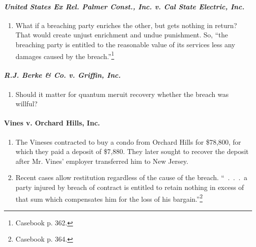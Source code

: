 \paragraph{\emph{United States Ex Rel. Palmer Const., Inc. v. Cal State 
Electric, Inc.}}

\begin{enumerate}
    \item What if a breaching party enriches the other, but gets nothing in 
    return? That would create unjust enrichment and undue punishment. So, 
    ``the breaching party is entitled to the reasonable value of its services 
    less any damages caused by the breach.''\footnote{Casebook p. 362.}
\end{enumerate}

\paragraph{\emph{R.J. Berke \& Co. v. Griffin, Inc.}}

\begin{enumerate}
    \item Should it matter for quantum meruit recovery whether the breach was 
    willful?
\end{enumerate}

\paragraph{Vines v. Orchard Hills, Inc.}

\begin{enumerate}
    \item The Vineses contracted to buy a condo from Orchard Hills for \$78,800, 
    for which they paid a deposit of \$7,880. They later sought to recover the 
    deposit after Mr. Vines' employer transferred him to New Jersey.
    \item Recent cases allow restitution regardless of the cause of the 
    breach. ``~.~.~.~a party injured by breach of contract is entitled to 
    retain nothing in excess of that sum which compensates him for the loss of 
    his bargain.''\footnote{Casebook p. 364.}
\end{enumerate}
